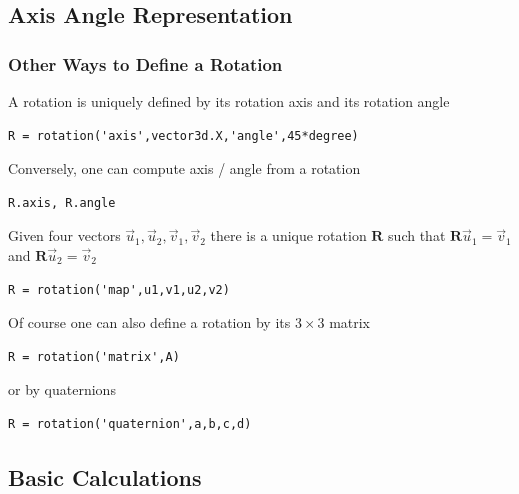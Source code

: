 \documentclass[compress]{beamer}
\begin{document}
\subsection*{Axis Angle Representation}
\label{sec:axis-angle-repr}

\begin{frame}[fragile]
  \frametitle{Other Ways to Define a Rotation}

  A rotation is uniquely defined by its rotation axis and its rotation angle

  \begin{lstlisting}[style=input]
R = rotation('axis',vector3d.X,'angle',45*degree)
  \end{lstlisting}

  \pause
  \medskip

  Conversely, one can compute axis / angle from a rotation

  \begin{lstlisting}[style=input]
R.axis, R.angle
  \end{lstlisting}

  \pause
  \medskip

Given four vectors $\vec u_{1}, \vec u_{2}, \vec v_{1}, \vec v_{2}$ there is a
unique rotation $\mathbf R$ such that  $\mathbf R \vec u_{1} = \vec v_{1}$ and
$\mathbf R \vec u_{2} = \vec v_{2}$

\begin{lstlisting}[style=input]
R = rotation('map',u1,v1,u2,v2)
\end{lstlisting}

  \pause
  \medskip

Of course one can also define a rotation by its $3 \times 3$ matrix

  \begin{lstlisting}[style=input]
R = rotation('matrix',A)
  \end{lstlisting}

or by quaternions

  \begin{lstlisting}[style=input]
R = rotation('quaternion',a,b,c,d)
  \end{lstlisting}

\end{frame}

\subsection*{Basic Calculations}
\label{sec:euler-angles}
\end{document}
